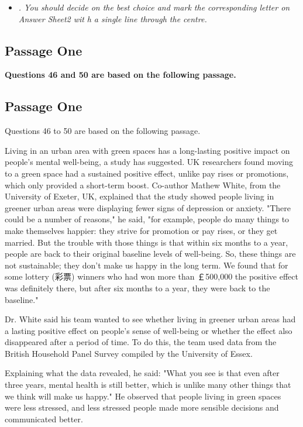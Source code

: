 \documentclass[UTF8,11pt]{ctexart}
\begin{document}
\begin{itemize}[leftmargin=2em,itemsep=.2em,topsep=.4em]\item[D.] \textit{. You should decide on the best choice and mark the corresponding letter on Answer Sheet2 wit} \textit{h a single line through the centre.}
\end{itemize}

\subsection*{\textbf{Passage One}}


\textbf{Questions 46 and 50 are based on the following passage.}


\subsection*{Passage One}


Questions 46 to 50 are based on the following passage.


Living in an urban area with green spaces has a long-lasting positive impact on people's mental well-being, a study has suggested. UK researchers found moving to a green space had a sustained positive effect, unlike pay rises or promotions, which only provided a short-term boost. Co-author Mathew White, from the University of Exeter, UK, explained that the study showed people living in greener urban areas were displaying fewer signs of depression or anxiety. "There could be a number of reasons," he said, "for example, people do many things to make themselves happier: they strive for promotion or pay rises, or they get married. But the trouble with those things is that within six months to a year, people are back to their original baseline levels of well-being. So, these things are not sustainable; they don't make us happy in the long term. We found that for some lottery (彩票) winners who had won more than ￡500,000 the positive effect was definitely there, but after six months to a year, they were back to the baseline."


Dr. White said his team wanted to see whether living in greener urban areas had a lasting positive effect on people's sense of well-being or whether the effect also disappeared after a period of time. To do this, the team used data from the British Household Panel Survey compiled by the University of Essex.


Explaining what the data revealed, he said: "What you see is that even after three years, mental health is still better, which is unlike many other things that we think will make us happy." He observed that people living in green spaces were less stressed, and less stressed people made more sensible decisions and communicated better.
\end{document}
